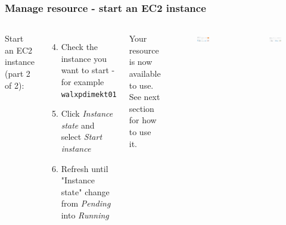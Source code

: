 \documentclass[aspectratio=169]{beamer} %
\newcommand{\ectwoName}{walxpdimekt01}
\begin{document}
\begin{frame}
	\frametitle{Manage resource - start an EC2 instance}
	
	\begin{columns}[c]
		
		
		Start an EC2 instance (part 2 of 2):
		
		\begin{enumerate}
			\setcounter{enumi}{3}
			\item Check the instance you want to start - for example \texttt{\ectwoName}
			\item Click \textit{Instance state} and select \textit{Start instance}
			\item Refresh until "Instance state" change from \textit{Pending} into \textit{Running}
		\end{enumerate}
		
		Your resource is now available to use. See next section for how to use it.

		\begin{figure}
			\centering
			\includegraphics[width=1\textwidth]{./img/ec2-2.png}
		\end{figure}
		\begin{figure}
			\centering
			\includegraphics[width=1\textwidth]{./img/ec2-3.png}
		\end{figure}
		\vspace{.5cm}
		
	\end{columns}
\end{frame}
\end{document}

